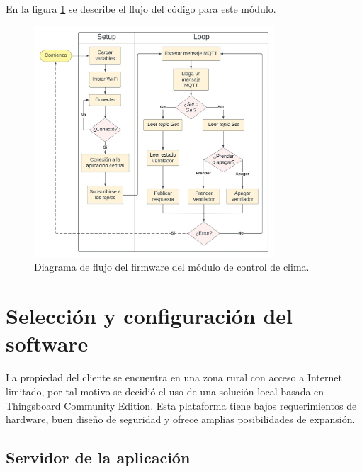 En la figura \ref{fig:flow_climacontrol} se describe el flujo del código para este módulo.

\begin{figure}[!h]
	\centering
	\includegraphics[width=0.8\textwidth]{./Figures/chapter3/FirmwareVentControl.jpg}
	\caption[Diagrama de flujo del firmware del módulo de control de clima]{Diagrama de flujo del firmware del módulo de control de clima.}
	\label{fig:flow_climacontrol}
\end{figure}










\pagebreak
\section{Selección y configuración del software}
\label{sec:Selección y configuración del software}

La propiedad del cliente se encuentra en una zona rural con acceso a Internet limitado, por tal motivo se decidió el uso de una solución local basada en  Thingsboard Community Edition.
Esta plataforma tiene bajos requerimientos de hardware, buen diseño de seguridad y ofrece amplias posibilidades de expansión.

\subsection{Servidor de la aplicación}
\label{sec:Servidor de la aplicación}

